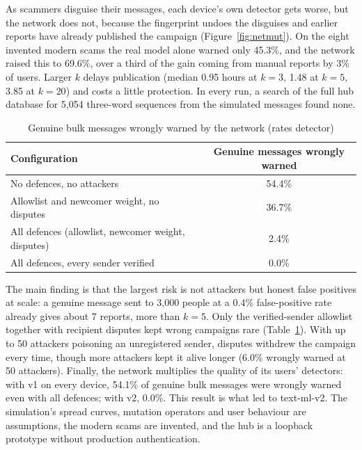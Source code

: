 \noindent As scammers disguise their messages, each device's own detector gets worse, but the network does not, because the fingerprint undoes the disguises and earlier reports have already published the campaign (Figure~\ref{fig:netmut}). On the eight invented modern scams the real model alone warned only 45.3\%, and the network raised this to 69.6\%, over a third of the gain coming from manual reports by 3\% of users. Larger $k$ delays publication (median 0.95 hours at $k=3$, 1.48 at $k=5$, 3.85 at $k=20$) and costs a little protection. In every run, a search of the full hub database for 5,054 three-word sequences from the simulated messages found none.\\

\begin{table}[H]
\centering
\small
\renewcommand{\arraystretch}{1.15}
\caption{Genuine bulk messages wrongly warned by the network (rates detector)}
\label{tab:net2}
\begin{tabular}{|l|c|}
\hline
\textbf{Configuration} & \textbf{Genuine messages wrongly warned} \\ \hline
No defences, no attackers & 54.4\% \\ \hline
Allowlist and newcomer weight, no disputes & 36.7\% \\ \hline
All defences (allowlist, newcomer weight, disputes) & 2.4\% \\ \hline
All defences, every sender verified & 0.0\% \\ \hline
\end{tabular}
\end{table}

\noindent The main finding is that the largest risk is not attackers but honest false positives at scale: a genuine message sent to 3,000 people at a 0.4\% false-positive rate already gives about 7 reports, more than $k=5$. Only the verified-sender allowlist together with recipient disputes kept wrong campaigns rare (Table~\ref{tab:net2}). With up to 50 attackers poisoning an unregistered sender, disputes withdrew the campaign every time, though more attackers kept it alive longer (6.0\% wrongly warned at 50 attackers). Finally, the network multiplies the quality of its users' detectors: with v1 on every device, 54.1\% of genuine bulk messages were wrongly warned even with all defences; with v2, 0.0\%. This result is what led to text-ml-v2. The simulation's spread curves, mutation operators and user behaviour are assumptions, the modern scams are invented, and the hub is a loopback prototype without production authentication.


